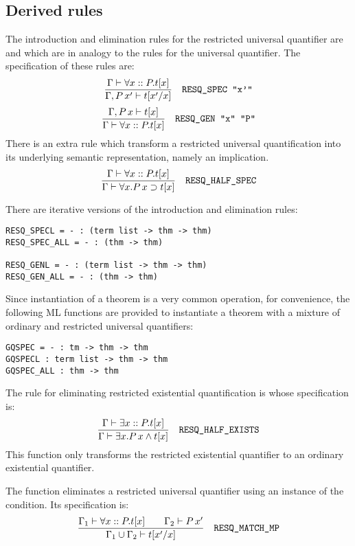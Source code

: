 \subsection{Derived rules}

The introduction and elimination rules for the restricted universal
quantifier are  and  which are in analogy
to the rules for the universal quantifier. The specification of these
rules are:
\[
\frac{\Gamma \THM \forall x :: P. t[x]}{\Gamma,P\,x'\THM t[x'/x]}
\quad\mbox{{\tt RESQ\_SPEC "x'"}}
\]
\[
\frac{\Gamma,P\,x\THM t[x]}{\Gamma \THM \forall x :: P. t[x]}
\quad\mbox{{\tt RESQ\_GEN "x" "P"}}
\]
There is an extra rule  which transform a
restricted universal quantification into its underlying semantic
representation, namely an implication.
\[
\frac{\Gamma \THM \forall x :: P. t[x]}{\Gamma \THM\forall x. P\,x\IMP t[x]}
\quad\mbox{{\tt RESQ\_HALF\_SPEC}}
\]

There are iterative versions of the introduction and elimination rules:
\begin{holboxed}
\begin{verbatim}
RESQ_SPECL = - : (term list -> thm -> thm)
RESQ_SPEC_ALL = - : (thm -> thm)

RESQ_GENL = - : (term list -> thm -> thm)
RESQ_GEN_ALL = - : (thm -> thm)
\end{verbatim}
\end{holboxed}

Since instantiation of a theorem is a very common operation, for
convenience, the following ML functions are provided to instantiate a
theorem with a mixture of ordinary and restricted universal quantifiers:
\begin{holboxed}
\begin{verbatim}
GQSPEC = - : tm -> thm -> thm
GQSPECL : term list -> thm -> thm
GQSPEC_ALL : thm -> thm
\end{verbatim}
\end{holboxed}

The rule for eliminating restricted existential quantification is
 whose specification is:
\[
\frac{\Gamma \THM \exists x:: P. t[x]}{\Gamma \THM \exists x. P\,x
\AND t[x]}\quad\mbox{{\tt RESQ\_HALF\_EXISTS}}
\]
This function only transforms the restricted existential quantifier to
an ordinary existential quantifier.

The function  eliminates a restricted universal
quantifier using an instance of the condition. Its specification is:
\[
\frac{\Gamma_1 \THM \forall x::P. t[x]\qquad\Gamma_2\THM P\,x'}
{\Gamma_1 \cup \Gamma_2 \THM t[x'/x]}\quad\mbox{{\tt RESQ\_MATCH\_MP}}
\]

